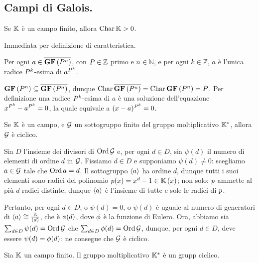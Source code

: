 \subsection{Campi di Galois.}\label{CampiDiGalois}
\begin{Theorem}
	Se $\mathbb{K}$ \`e un campo finito,
	allora $\operatorname{Char}{\mathbb{K}} > 0$.
\end{Theorem}
\Proof Immediata per definizione di caratteristica. \EndProof
\begin{Theorem}
	Per ogni $a \in \overline{\textbf{GF} \left ( P^n \right )}$,
	con $P \in \mathbb{Z}$ primo e $n \in \mathbb{N}$,
	e per ogni $k \in \mathbb{Z}$, $a$ \`e l'unica radice
	$P^k$-esima di $a^{P^k}$.
\end{Theorem}
\Proof $\textbf{GF} \left ( P^n \right ) \subseteq
\overline{\textbf{GF} \left ( P^n \right )}$, dunque
$\operatorname{Char}{\overline{\textbf{GF} \left ( P^n \right )}} =
\operatorname{Char}{\textbf{GF} \left ( P^n \right )} = P$.
Per definizione una radice $P^k$-esima di $a$ \`e una soluzione
dell'equazione $x^{P^k} - a^{P^k} = 0$, la quale equivale a
$(x - a)^{P^k} = 0$. \EndProof
\begin{Theorem}
	Se $\mathbb{K}$ \`e un campo,
	e $\mathcal{G}$ un sottogruppo finito del
	gruppo moltiplicativo $\mathbb{K}^*$,
	allora $\mathcal{G}$ \`e ciclico.
\end{Theorem}
\Proof
Sia $D$ l'insieme dei divisori di $\operatorname{\operatorname{Ord}}{\mathcal{G}}$ e,
per ogni $d \in D$, sia $\psi(d)$ il numero di elementi di ordine $d$ in
$\mathcal{G}$.
Fissiamo $d \in D$ e supponiamo $\psi(d) \neq 0$: scegliamo
$a \in \mathcal{G}$ tale che $\operatorname{Ord}{a} = d$.
Il sottogruppo $\left < a \right >$ ha ordine $d$,
dunque tutti i suoi elementi sono radici del polinomio
$p(x) = x^d - 1 \in \mathbb{K} \left ( x \right )$;
non solo: $p$ ammette al pi\`u $d$ radici distinte,
dunque $\left < a \right >$ \`e l'insieme di tutte e sole le radici di
$p$.
\par
Pertanto, per ogni $d \in D$,
o $\psi(d) = 0$,
o $\psi(d)$ \`e uguale al numero di generatori di
$\left < a \right > \cong \frac{\mathbb{Z}}{\left ( d \right )}$,
che \`e $\phi(d)$, dove $\phi$ \`e la funzione di
Eulero.
Ora, abbiamo sia $\sum_{d \in D} \psi(d) = \operatorname{\operatorname{Ord}}{\mathcal{G}}$ che
$\sum_{d \in D} \phi(d) = \operatorname{\operatorname{Ord}}{\mathcal{G}}$, dunque,
per ogni $d \in D$, deve essere $\psi(d) = \phi(d)$:
ne consegue che
$\mathcal{G}$ \`e ciclico.
\EndProof
\begin{Corollary}
	Sia $\mathbb{K}$ un campo finito.
	Il gruppo moltiplicativo $\mathbb{K}^*$ \`e
	un grupp ciclico.
\end{Corollary}
